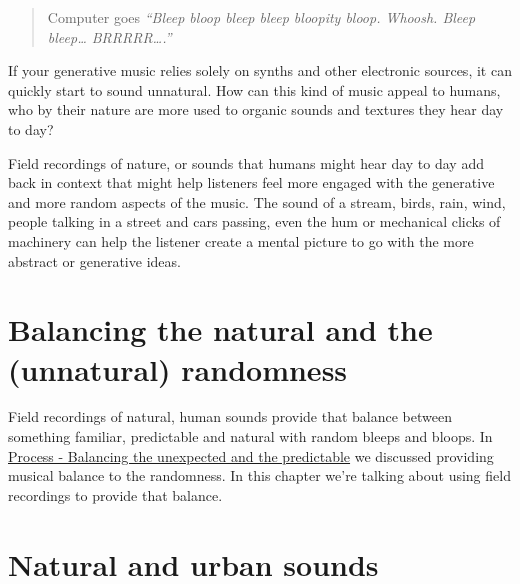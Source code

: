 \documentclass[
  12pt,
  letterpaper,
  oneside,
  open=any]{scrbook}
\begin{document}
\begin{quote}
Computer goes \emph{``Bleep bloop bleep bleep bloopity bloop. Whoosh.
Bleep bleep\ldots{} BRRRRR\ldots.''}
\end{quote}

If your generative music relies solely on synths and other electronic
sources, it can quickly start to sound unnatural. How can this kind of
music appeal to humans, who by their nature are more used to organic
sounds and textures they hear day to day?

\begin{tcolorbox}[enhanced jigsaw, breakable, left=2mm, leftrule=.75mm, toprule=.15mm, opacitybacktitle=0.6, toptitle=1mm, coltitle=black, colback=white, colbacktitle=quarto-callout-tip-color!10!white, opacityback=0, rightrule=.15mm, bottomrule=.15mm, titlerule=0mm, title=\textcolor{quarto-callout-tip-color}{\faLightbulb}\hspace{0.5em}{Key idea}, arc=.35mm, bottomtitle=1mm, colframe=quarto-callout-tip-color-frame]

Field recordings of nature, or sounds that humans might hear day to day
add back in context that might help listeners feel more engaged with the
generative and more random aspects of the music. The sound of a stream,
birds, rain, wind, people talking in a street and cars passing, even the
hum or mechanical clicks of machinery can help the listener create a
mental picture to go with the more abstract or generative ideas.

\end{tcolorbox}

\section{Balancing the natural and the (unnatural)
randomness}\label{balancing-the-natural-and-the-unnatural-randomness}

Field recordings of natural, human sounds provide that balance between
something familiar, predictable and natural with random bleeps and
bloops. In
\hyperref[Chapter-008-Process-Balance_unexpected_and_predictable]{Process
- Balancing the unexpected and the predictable} we discussed providing
musical balance to the randomness. In this chapter we're talking about
using field recordings to provide that balance.

\section{Natural and urban sounds}\label{natural-and-urban-sounds}
\end{document}
